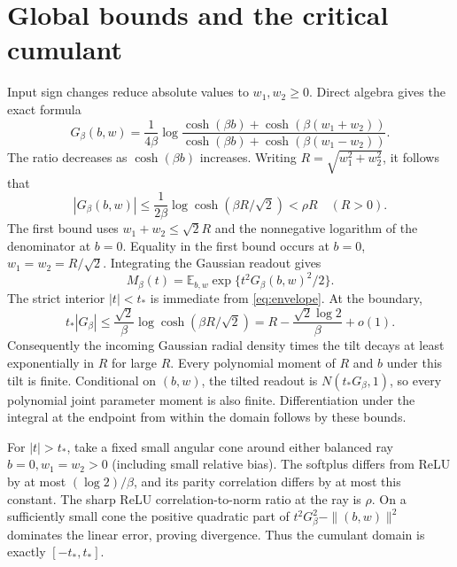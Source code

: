 \documentclass[11pt]{article}
\newcommand{\E}{\mathbb E}
\begin{document}
\section{Global bounds and the critical cumulant}
Input sign changes reduce absolute values to $w_1,w_2\ge0$. Direct
algebra gives the exact formula
\[
 G_\beta(b,w)=\frac1{4\beta}
 \log\frac{\cosh(\beta b)+\cosh(\beta(w_1+w_2))}
               {\cosh(\beta b)+\cosh(\beta(w_1-w_2))}.
\]
The ratio decreases as $\cosh(\beta b)$ increases. Writing
$R=\sqrt{w_1^2+w_2^2}$, it follows that
\begin{equation}\label{eq:envelope}
 |G_\beta(b,w)|\le\frac1{2\beta}\log\cosh(\beta R/\sqrt2)
                         <\rho R\quad(R>0).
\end{equation}
The first bound uses $w_1+w_2\le\sqrt2R$ and the nonnegative logarithm
of the denominator at $b=0$. Equality in the first bound occurs at
$b=0$, $w_1=w_2=R/\sqrt2$.
Integrating the Gaussian readout gives
\[
 M_\beta(t)=\E_{b,w}\exp\{t^2G_\beta(b,w)^2/2\}.
\]
The strict interior $|t|<t_*$ is immediate from \eqref{eq:envelope}.
At the boundary,
\[
 t_*|G_\beta|\le\frac{\sqrt2}{\beta}
                                  \log\cosh(\beta R/\sqrt2)
             =R-\frac{\sqrt2\log2}{\beta}+o(1).
\]
Consequently the incoming Gaussian radial density times the tilt
decays at least exponentially in $R$ for large $R$. Every polynomial
moment of $R$ and $b$ under this tilt is finite. Conditional on $(b,w)$,
the tilted readout is $N(t_*G_\beta,1)$, so every polynomial joint
parameter moment is also finite. Differentiation under the integral
at the endpoint from within the domain follows by these bounds.

For $|t|>t_*$, take a fixed small angular cone around either balanced
ray $b=0,w_1=w_2>0$ (including small relative bias). The softplus differs
from ReLU by at most $(\log2)/\beta$, and its parity correlation differs
by at most this constant. The sharp ReLU correlation-to-norm ratio at
the ray is $\rho$. On a sufficiently small cone the positive quadratic
part of $t^2G_\beta^2-\|(b,w)\|^2$ dominates the linear error, proving
divergence. Thus the cumulant domain is exactly $[-t_*,t_*]$.
\end{document}

